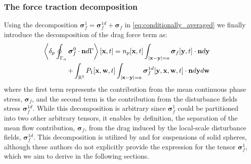 \subsubsection{The force traction decomposition}

Using the decomposition $\bm\sigma_f^1 = \bm\sigma_f^{1d} + \bm\sigma_f$ in \ref{eq:conditionally_averaged} we finally introduce the decomposition of the drag force term as:  
\begin{align}
    \pSavg{\bm\sigma_f^0\cdot\textbf{n}}[\textbf{x},t]
    =
    n_p[\textbf{x},t]
    \int_{|\textbf{x}-\textbf{y}|=a}
    \bm\sigma_f[\textbf{y},t]
    \cdot \textbf{n}
    d\textbf{y}\\
    + 
    \int_{\mathbb{R}^3}
    P_1[\textbf{x},\textbf{w},t]
    \int_{|\textbf{x}-\textbf{y}|=a}
    \bm\sigma_f^{1d}[\textbf{y},\textbf{x},\textbf{w},t]
    \cdot \textbf{n}
    d\textbf{y}
    d\textbf{w}
    \label{eq:general_partition}
\end{align}
where the first term represents the contribution from the mean continuous phase stress, $\bm\sigma_f$, and the second term is the contribution from the disturbance fields stress $\bm\sigma_f^{1d}$. 
While this decomposition is arbitrary since $\bm\sigma_f^1$ could be partitioned into two other arbitrary tensors, it enables by definition, the separation of the mean flow contribution, $\bm\sigma_f$, from the drag induced by the local-scale disturbance fields, $\bm\sigma_f^{1d}$.
This decomposition is utilized by \citet[Chapter 2]{jackson2000} and \citet{zhang1997momentum,wang2021numerical,wang2024effect} for suspensions of solid spheres, although these authors do not explicitly provide the expression for the tensor $\bm\sigma_f^1$, which we aim to derive in the following sections. 

